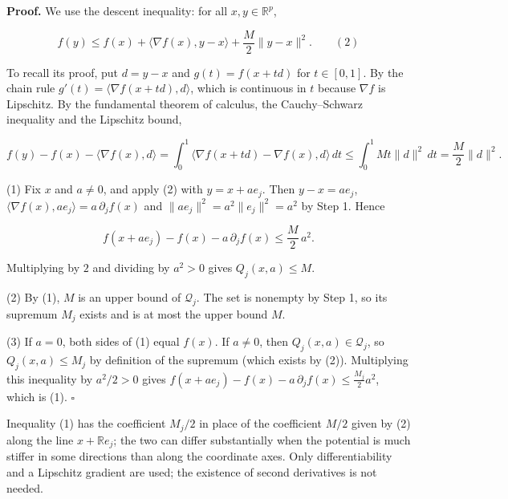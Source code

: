 \documentclass[11pt,a4paper]{article}
\begin{document}
\textbf{Proof.} We use the descent inequality: for all \(x,y\in\mathbb R^p\),


\[f(y)\le f(x)+\langle\nabla f(x),y-x\rangle+\frac M2\|y-x\|^2.\qquad(2)\]


To recall its proof, put \(d=y-x\) and \(g(t)=f(x+td)\) for \(t\in[0,1]\). By the chain rule \(g'(t)=\langle\nabla f(x+td),d\rangle\), which is continuous in \(t\) because \(\nabla f\) is Lipschitz. By the fundamental theorem of calculus, the Cauchy–Schwarz inequality and the Lipschitz bound,


\[f(y)-f(x)-\langle\nabla f(x),d\rangle=\int_0^1\langle\nabla f(x+td)-\nabla f(x),d\rangle\,dt\le\int_0^1Mt\|d\|^2\,dt=\frac M2\|d\|^2.\]


(1) Fix \(x\) and \(a\ne0\), and apply (2) with \(y=x+ae_j\). Then \(y-x=ae_j\), \(\langle\nabla f(x),ae_j\rangle=a\,\partial_jf(x)\) and \(\|ae_j\|^2=a^2\|e_j\|^2=a^2\) by Step 1. Hence


\[f(x+ae_j)-f(x)-a\,\partial_jf(x)\le\frac M2\,a^2.\]


Multiplying by \(2\) and dividing by \(a^2>0\) gives \(Q_j(x,a)\le M\).




(2) By (1), \(M\) is an upper bound of \(\mathcal Q_j\). The set is nonempty by Step 1, so its supremum \(M_j\) exists and is at most the upper bound \(M\).




(3) If \(a=0\), both sides of (1) equal \(f(x)\). If \(a\ne0\), then \(Q_j(x,a)\in\mathcal Q_j\), so \(Q_j(x,a)\le M_j\) by definition of the supremum (which exists by (2)). Multiplying this inequality by \(a^2/2>0\) gives \(f(x+ae_j)-f(x)-a\,\partial_jf(x)\le\frac{M_j}2a^2\), which is (1). \(\square\)




Inequality (1) has the coefficient \(M_j/2\) in place of the coefficient \(M/2\) given by (2) along the line \(x+\mathbb Re_j\); the two can differ substantially when the potential is much stiffer in some directions than along the coordinate axes. Only differentiability and a Lipschitz gradient are used; the existence of second derivatives is not needed.
\end{document}
